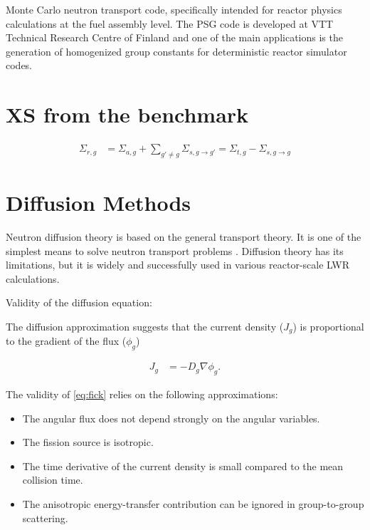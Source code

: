 \documentclass[11pt,letterpaper]{article}
\begin{document}
Monte Carlo neutron transport code, specifically intended for reactor physics calculations at the fuel assembly level.
The PSG code is developed at VTT Technical Research Centre of Finland and one of the main applications is the generation of homogenized group constants for deterministic reactor simulator codes.

\cite{leppanen_development_2007}

\section{XS from the benchmark}

\begin{align}
\Sigma_{r,g} &= \Sigma_{a,g} + \sum_{g' \ne g} \Sigma_{s,g \rightarrow g'} = \Sigma_{t,g} - \Sigma_{s, g \rightarrow g}
\label{eq:removal}
\end{align}

\section{Diffusion Methods}

Neutron diffusion theory is based on the general transport theory.
It is one of the simplest means to solve neutron transport problems \cite{leppanen_development_2007}.
Diffusion theory has its limitations, but it is widely and successfully used in various reactor-scale LWR calculations.

Validity of the diffusion equation:

The diffusion approximation suggests that the current density ($J_g$) is proportional to the gradient of the flux ($\phi_g$)

\begin{align}
J_g &= -D_g \nabla \phi_g.
\label{eq:fick}
\end{align}

The validity of \ref{eq:fick} relies on the following approximations:


\begin{itemize}
	\item The angular flux does not depend strongly on the angular variables.
	\item The fission source is isotropic.
	\item The time derivative of the current density is small compared to the mean collision time.
	\item The anisotropic energy-transfer contribution can be ignored in group-to-group scattering.
\end{itemize}
\end{document}
